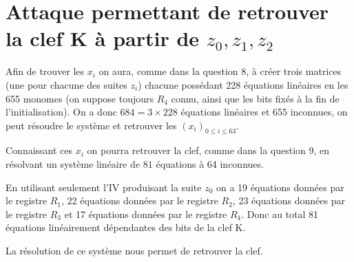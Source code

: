 \section{Attaque permettant de retrouver la clef K à partir de $z_0, z_1, z_2$}
Afin de trouver les $x_i$ on aura, comme dans la question 8, à créer trois matrices (une pour chacune des suites $z_i$)
chacune possédant 228 équations linéaires en les 655 monomes (on suppose toujours $R_4$ connu, ainsi que les bits fixés à la fin de l'initialisation).
On a donc $684 = 3 \times 228$ équations linéaires et 655 inconnues, on peut résoudre le système et retrouver les $(x_i)_{0\leq i \leq 63}$.

Connaissant ces $x_i$ on pourra retrouver la clef, comme dans la question 9, en résolvant un système linéaire de $81$ équations à 64 inconnues.

En utilisant seulement l'IV produisant la suite $z_0$ on a 19 équations données par le registre $R_1$,
22 équations données par le registre $R_2$, 23 équations données par le registre $R_3$ et 17 équations données par le registre $R_4$.
Donc au total 81 équations linéairement dépendantes des bits de la clef K.

La résolution de ce système nous permet de retrouver la clef.
